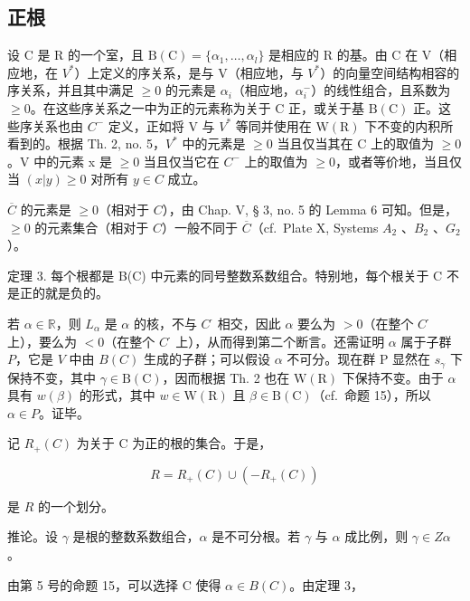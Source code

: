 \subsection{正根}

设 C 是 R 的一个室，且 \(\mathrm{B}(\mathrm{C})=\{\alpha_{1},\ldots,\alpha_{l}\}\) 是相应的 R 的基。由 C 在 V（相应地，在 \(V^{*}\)）上定义的序关系，是与 V（相应地，与 \(V^{*}\)）的向量空间结构相容的序关系，并且其中满足 \(\geqslant0\) 的元素是 \(\alpha_{i}\)（相应地，\(\alpha_{i}^{-}\)）的线性组合，且系数为 \(\geqslant0\)。在这些序关系之一中为正的元素称为关于 C 正，或关于基 \(\mathrm{B}(\mathrm{C})\) 正。这些序关系也由 \(C^{-}\) 定义，正如将 V 与 \(V^{*}\) 等同并使用在 \(\mathrm{W}(\mathrm{R})\) 下不变的内积所看到的。根据 Th. 2, no. 5，\(V^{*}\) 中的元素是 \(\geqslant0\) 当且仅当其在 C 上的取值为 \(\geqslant0\)。V 中的元素 x 是 \(\geqslant0\) 当且仅当它在 \(C^{-}\) 上的取值为 \(\geqslant0\)，或者等价地，当且仅当 \((x|y)\geqslant0\) 对所有 \(y\in C\) 成立。

\(\overline{C}\) 的元素是 \(\geqslant 0\)（相对于 \(C\)），由 Chap. V, § 3, no. 5 的 Lemma 6 可知。但是，\(\geqslant 0\) 的元素集合（相对于 \(C\)）一般不同于 \(\overline{C}\)（cf.~Plate X, Systems \(A_2\) 、\(B_2\) 、\(G_2\)）。

定理 3. 每个根都是 B(C) 中元素的同号整数系数组合。特别地，每个根关于 C 不是正的就是负的。

若 \(\alpha \in \mathbb{R}\)，则 \(L_{\alpha}\) 是 \(\alpha\) 的核，不与 \(C^{\cdot}\) 相交，因此 \(\alpha\) 要么为 \(>0\)（在整个 \(C^{\cdot}\) 上），要么为 \(< 0\)（在整个 \(C^{\cdot}\) 上），从而得到第二个断言。还需证明 \(\alpha\) 属于子群 \(P\)，它是 \(V\) 中由 \(B(C)\) 生成的子群；可以假设 \(\alpha\) 不可分。现在群 P 显然在 \(s_{\gamma}\) 下保持不变，其中 \(\gamma \in \mathrm{B}(\mathrm{C})\)，因而根据 Th. 2 也在 \(\mathrm{W}(\mathrm{R})\) 下保持不变。由于 \(\alpha\) 具有 \(w(\beta)\) 的形式，其中 \(w \in \mathrm{W}(\mathrm{R})\) 且 \(\beta \in \mathrm{B}(\mathrm{C})\)（cf.~命题 15），所以 \(\alpha \in P\)。证毕。

记 \(R_{+}(C)\) 为关于 C 为正的根的集合。于是，

\[
R = R _ {+} (C) \cup (- R _ {+} (C))
\]

是 \(R\) 的一个划分。

推论。设 \(\gamma\) 是根的整数系数组合，\(\alpha\) 是不可分根。若 \(\gamma\) 与 \(\alpha\) 成比例，则 \(\gamma \in Z\alpha\)。

由第 5 号的命题 15，可以选择 C 使得 \(\alpha \in B(C)\)。由定理 3，

